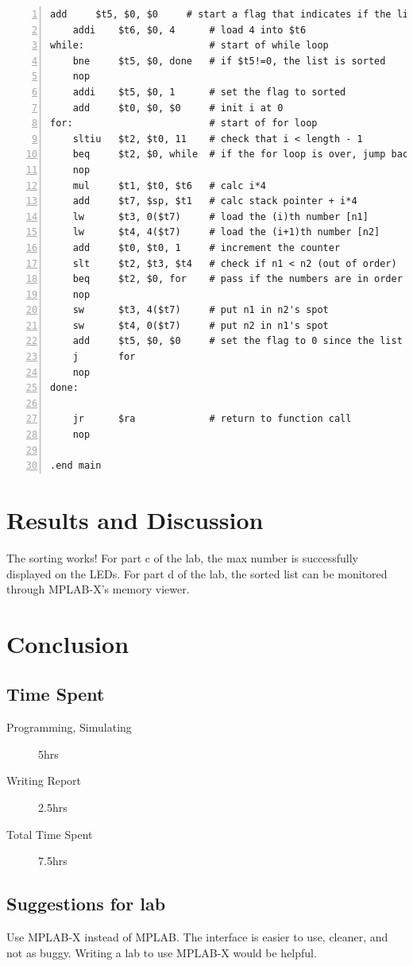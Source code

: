 \documentclass[11pt]{article}
\begin{document}
\begin{lstlisting}[numbers=left,basicstyle=\footnotesize]
    add     $t5, $0, $0     # start a flag that indicates if the list is sorted.
    addi    $t6, $0, 4      # load 4 into $t6
while:                      # start of while loop
    bne     $t5, $0, done   # if $t5!=0, the list is sorted
    nop
    addi    $t5, $0, 1      # set the flag to sorted
    add     $t0, $0, $0     # init i at 0 
for:                        # start of for loop
    sltiu   $t2, $t0, 11    # check that i < length - 1
    beq     $t2, $0, while  # if the for loop is over, jump back to the while loop
    nop
    mul     $t1, $t0, $t6   # calc i*4
    add     $t7, $sp, $t1   # calc stack pointer + i*4
    lw      $t3, 0($t7)     # load the (i)th number [n1]
    lw      $t4, 4($t7)     # load the (i+1)th number [n2]
    add     $t0, $t0, 1     # increment the counter
    slt     $t2, $t3, $t4   # check if n1 < n2 (out of order)
    beq     $t2, $0, for    # pass if the numbers are in order ($t2=0)
    nop
    sw      $t3, 4($t7)     # put n1 in n2's spot
    sw      $t4, 0($t7)     # put n2 in n1's spot
    add     $t5, $0, $0     # set the flag to 0 since the list is not sorted
    j       for
    nop
done:
    
    jr      $ra             # return to function call
    nop

.end main
\end{lstlisting}


\section{Results and Discussion}

The sorting works! For part c of the lab, the max number is successfully displayed on the LEDs. For part d of the lab, the sorted list can be monitored through MPLAB-X's memory viewer.


\section{Conclusion}

\subsection{Time Spent}

\begin{description}
	\item[Programming, Simulating] 5hrs
	\item[Writing Report] 2.5hrs
	\item[Total Time Spent] 7.5hrs
\end{description}

\subsection{Suggestions for lab}

Use MPLAB-X instead of MPLAB. The interface is easier to use, cleaner, and not as buggy. Writing a lab to use MPLAB-X would be helpful.
\end{document}
